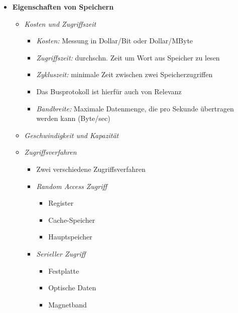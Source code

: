 \begin{itemize}
        \item \textbf{Eigenschaften von Speichern}
            \begin{itemize}
                \item \textit{Kosten und Zugriffszeit}
                    \begin{itemize}
                        \item \textit{Kosten:} Messung in Dollar/Bit oder Dollar/MByte
                        \item \textit{Zugriffszeit:} durchschn. Zeit um Wort aus Speicher zu lesen
                        \item \textit{Zykluszeit:} minimale Zeit zwischen zwei Speicherzugriffen
                        \item Das Busprotokoll ist hierfür auch von Relevanz
                        \item \textit{Bandbreite:} Maximale Datenmenge, die pro Sekunde übertragen werden kann (Byte/sec)
                    \end{itemize}
                \item \textit{Geschwindigkeit und Kapazität}
                \item \textit{Zugriffsverfahren}
                    \begin{itemize}
                        \item Zwei verschiedene Zugriffsverfahren
                        \item \textit{Random Access Zugriff}
                            \begin{itemize}
                                \item Register
                                \item Cache-Speicher
                                \item Hauptspeicher
                            \end{itemize}
                        \item \textit{Serieller Zugriff}
                            \begin{itemize}
                                \item Festplatte
                                \item Optische Daten
                                \item Magnetband
                            \end{itemize}
                    \end{itemize}

\end{itemize}
\end{itemize}
